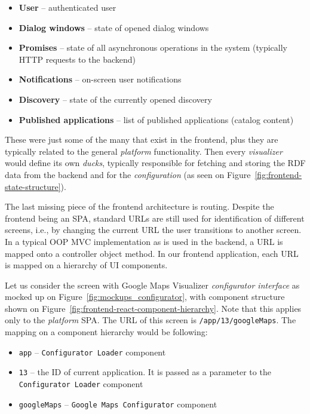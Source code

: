 \begin{itemize}
\item \textbf{User} -- authenticated user
\item \textbf{Dialog windows} -- state of opened dialog windows
\item \textbf{Promises} -- state of all asynchronous operations in the system (typically HTTP requests to the backend)
\item \textbf{Notifications }-- on-screen user notifications
\item \textbf{Discovery} -- state of the currently opened discovery
\item \textbf{Published applications} -- list of published applications (catalog content)
\end{itemize}

These were just some of the many that exist in the frontend, plus they are typically related to the general \emph{platform} functionality. Then every \emph{visualizer} would define its own \emph{ducks}, typically responsible for fetching and storing the RDF data from the backend and for the \emph{configuration} (as seen on Figure~\ref{fig:frontend-state-structure}).

The last missing piece of the frontend architecture is routing. Despite the frontend being an SPA, standard URLs are still used for identification of different screens, i.e., by changing the current URL the user transitions to another screen. In a typical OOP MVC implementation as is used in the backend, a URL is mapped onto a controller object method. In our frontend application, each URL is mapped on a hierarchy of UI components. 

Let us consider the screen with Google Maps Visualizer \emph{configurator interface} as mocked up on Figure~\ref{fig:mockups_configurator}, with component structure shown on Figure~\ref{fig:frontend-react-component-hierarchy}. Note that this applies only to the \emph{platform} SPA. The URL of this screen is \texttt{/app/13/googleMaps}. The mapping on a component hierarchy would be following:

\begin{itemize}
\item \texttt{app} -- \texttt{Configurator Loader} component
\item \texttt{13} -- the ID of current application. It is passed as a parameter to the \texttt{Configurator Loader} component
\item \texttt{googleMaps} -- \texttt{Google Maps Configurator} component
\end{itemize}

